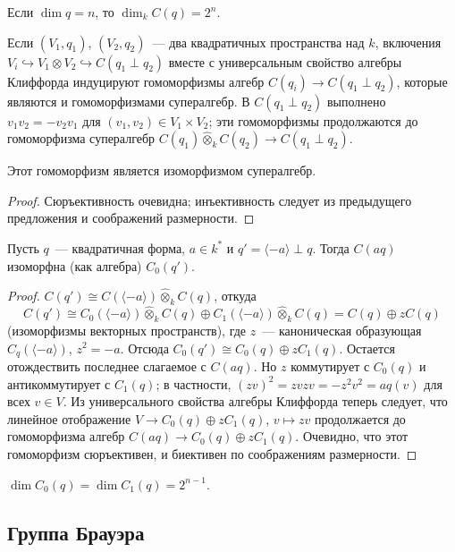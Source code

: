 \documentclass[a4paper,oneside,12pt]{article}
\theoremstyle{plain} { \swapnumbers
\newtheorem{theorem}{Теорема}[subsection]
\newtheorem{corollary}[theorem]{Следствие}
\newtheorem{lemma}[theorem]{Лемма}
\newtheorem{proposition}[theorem]{Утверждение}
\newtheorem{claim}[theorem]{Факт}
}
\theoremstyle{definition} { \swapnumbers
\newtheorem{definition}[theorem]{Определение}
\newtheorem{notation}[theorem]{Обозначение}
\newtheorem{remark}[theorem]{Замечание}
\newtheorem{remarks}[theorem]{Замечания}
\newtheorem{example}[theorem]{Пример}
\newtheorem{examples}[theorem]{Примеры}
\newtheorem{sssection}[theorem]{}
}
\def\la{\langle}
\def\ra{\rangle}
\begin{document}
\begin{proposition}
Если $\dim q=n$, то $\dim_k C(q)=2^n$.
\end{proposition}

Если $(V_1,q_1)$, $(V_2,q_2)$~--- два квадратичных пространства над $k$, включения
$V_i\hookrightarrow V_1\otimes V_2\hookrightarrow C(q_1\perp q_2)$ вместе с универсальным
свойство алгебры Клиффорда индуцируют гомоморфизмы алгебр $C(q_i)\to C(q_1\perp q_2)$,
которые являются и гомоморфизмами супералгебр.
В $C(q_1\perp q_2)$ выполнено $v_1v_2=-v_2v_1$ для $(v_1,v_2)\in V_1\times V_2$;
эти гомоморфизмы продолжаются до гомоморфизма супералгебр
$C(q_1)\hat\otimes_kC(q_2)\to C(q_1\perp q_2)$.
\begin{theorem}\label{thm:tensor_product_of_superalgebras}
Этот гомоморфизм является изоморфизмом супералгебр.
\end{theorem}
\begin{proof}
Сюръективность очевидна; инъективность следует из предыдущего предложения и соображений размерности.
\end{proof}

\begin{corollary}
Пусть $q$~--- квадратичная форма, $a\in k^*$ и $q'=\la -a\ra\perp q$.
Тогда $C(aq)$ изоморфна (как алгебра) $C_0(q')$.
\end{corollary}
\begin{proof}
$C(q')\cong C(\la -a\ra)\hat\otimes_k C(q)$, откуда
$$
C(q')\cong C_0(\la -a\ra)\hat\otimes_kC(q)\oplus C_1(\la -a\ra)\hat\otimes_kC(q)=C(q)\oplus zC(q)
$$
(изоморфизмы векторных пространств), где $z$~--- каноническая образующая $C_q(\la-a\ra)$, $z^2=-a$.
Отсюда $C_0(q')\cong C_0(q)\oplus zC_1(q)$.
Остается отождествить последнее слагаемое с $C(aq)$. Но $z$ коммутирует с $C_0(q)$
и антикоммутирует с $C_1(q)$; в частности, $(zv)^2=zvzv=-z^2v^2=aq(v)$ для всех $v\in V$.
Из универсального свойства алгебры Клиффорда теперь следует, что линейное отображение
$V\to C_0(q)\oplus zC_1(q)$, $v\mapsto zv$ продолжается до гомоморфизма алгебр
$C(aq)\to C_0(q)\oplus zC_1(q)$. Очевидно, что этот гомоморфизм сюръективен,
и биективен по соображениям размерности.
\end{proof}

\begin{corollary}
$\dim C_0(q)=\dim C_1(q)=2^{n-1}$.
\end{corollary}

\subsection{Группа Брауэра}
\end{document}
